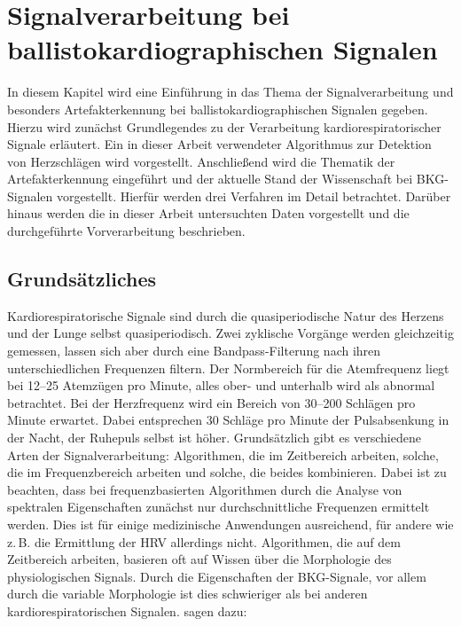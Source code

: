 \chapter{Signalverarbeitung bei ballistokardiographischen Signalen}\label{signalverarbeitung}

In diesem Kapitel wird eine Einführung in das Thema der Signalverarbeitung und besonders Artefakterkennung bei ballistokardiographischen Signalen gegeben. Hierzu wird zunächst Grundlegendes zu der Verarbeitung kardiorespiratorischer Signale erläutert. Ein in dieser Arbeit verwendeter Algorithmus zur Detektion von Herzschlägen wird vorgestellt. Anschließend wird die Thematik der Artefakterkennung eingeführt und der aktuelle Stand der Wissenschaft bei \ac{BKG}-Signalen vorgestellt. Hierfür werden drei Verfahren im Detail betrachtet. Darüber hinaus werden die in dieser Arbeit untersuchten Daten vorgestellt und die durchgeführte Vorverarbeitung beschrieben.

\section{Grundsätzliches}

	Kardiorespiratorische Signale sind durch die quasiperiodische Natur des Herzens und der Lunge selbst quasiperiodisch. Zwei zyklische Vorgänge werden gleichzeitig gemessen, lassen sich aber durch eine Bandpass-Filterung nach ihren unterschiedlichen Frequenzen filtern. Der Normbereich für die Atemfrequenz liegt bei \numrange{12}{25} Atemzügen pro Minute, alles ober- und unterhalb wird als abnormal betrachtet. Bei der Herzfrequenz wird ein Bereich von \numrange{30}{200} Schlägen pro Minute erwartet. Dabei entsprechen 30 Schläge pro Minute der Pulsabsenkung in der Nacht, der Ruhepuls selbst ist höher. Grundsätzlich gibt es verschiedene Arten der Signalverarbeitung: Algorithmen, die im Zeitbereich arbeiten, solche, die im Frequenzbereich arbeiten und solche, die beides kombinieren. Dabei ist zu beachten, dass bei frequenzbasierten Algorithmen durch die Analyse von spektralen Eigenschaften zunächst nur durchschnittliche Frequenzen ermittelt werden. Dies ist für einige medizinische Anwendungen ausreichend, für andere wie z.\,B. die Ermittlung der \ac{HRV} allerdings nicht. Algorithmen, die auf dem Zeitbereich arbeiten, basieren oft auf Wissen über die Morphologie des physiologischen Signals. Durch die Eigenschaften der \ac{BKG}-Signale, vor allem durch die variable Morphologie ist dies schwieriger als bei anderen kardiorespiratorischen Signalen. %
	\citeauthor{Paalasmaa2015} sagen dazu:

